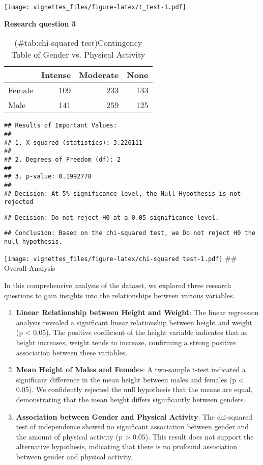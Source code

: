 \documentclass[
]{article}
\begin{document}
\texttt{[image: vignettes\_files/figure-latex/t\_test-1.pdf]}

\textbf{Research question 3}

\begin{table}

\caption{(\#tab:chi-squared test)Contingency Table of Gender vs. Physical Activity}
\centering
\begin{tabular}[t]{l|r|r|r}
\hline
  & Intense & Moderate & None\\
\hline
Female & 109 & 233 & 133\\
\hline
Male & 141 & 259 & 125\\
\hline
\end{tabular}
\end{table}

\begin{verbatim}
## Results of Important Values: 
## 
## 1. X-squared (statistics): 3.226111 
## 
## 2. Degrees of Freedom (df): 2 
## 
## 3. p-value: 0.1992778 
## 
## Decision: At 5% significance level, the Null Hypothesis is not rejected
\end{verbatim}

\begin{verbatim}
## Decision: Do not reject H0 at a 0.05 significance level.
\end{verbatim}

\begin{verbatim}
## Conclusion: Based on the chi-squared test, we Do not reject H0 the null hypothesis.
\end{verbatim}

\texttt{[image: vignettes\_files/figure-latex/chi-squared test-1.pdf]}
\#\# Overall Analysis

In this comprehensive analysis of the dataset, we explored three research questions to gain insights into the relationships between various variables.

\begin{enumerate}
\def\labelenumi{\arabic{enumi}.}
\item
  \textbf{Linear Relationship between Height and Weight}: The linear regression analysis revealed a significant linear relationship between height and weight (p \textless{} 0.05). The positive coefficient of the height variable indicates that as height increases, weight tends to increase, confirming a strong positive association between these variables.
\item
  \textbf{Mean Height of Males and Females}: A two-sample t-test indicated a significant difference in the mean height between males and females (p \textless{} 0.05). We confidently rejected the null hypothesis that the means are equal, demonstrating that the mean height differs significantly between genders.
\item
  \textbf{Association between Gender and Physical Activity}: The chi-squared test of independence showed no significant association between gender and the amount of physical activity (p \textgreater{} 0.05). This result does not support the alternative hypothesis, indicating that there is no profound association between gender and physical activity.
\end{enumerate}
\end{document}
